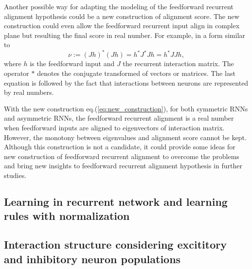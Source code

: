 \documentclass[11pt]{article}
\begin{document}
	Another possible way for adapting the modeling of the feedforward recurrent alignment hypothesis could be a new construction of alignment score. The new construction could even allow the feedforward recurrent input align in complex plane but resulting the final score in real number. For example, in a form similar to
	\begin{equation} \label{eq:new_construction}
		\nu := (Jh)^*(Jh) = h^*J^*Jh = h^*JJh, 
	\end{equation} 
	where $h$ is the feedforward input and $J$ the recurrent interaction matrix. The operator $*$ denotes the conjugate transformed of vectors or matrices. The last equation is followed by the fact that interactions between neurons are represented by real numbers. 
	
	With the new construction eq.(\ref{eq:new_construction}), for both symmetric RNNs and asymmetric RNNs, the feedforward recurrent alignment is a real number when feedforward inputs are aligned to eigenvectors of interaction matrix. However, the monotony between eigenvalues and alignment score cannot be kept. %
	Although this construction is not a candidate, it could provide some ideas for new construction of feedforward recurrent alignment to overcome the problems and bring new insights to feedforward recurrent alignment hypothesis in further studies. 
	
	\subsection*{Learning in recurrent network and learning rules with normalization}
	
	\subsection*{Interaction structure considering excititory and inhibitory neuron populations}
	
	
\end{document}
